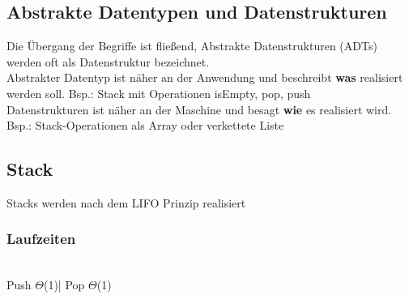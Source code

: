 \documentclass[jou,apacite]{apa6}
\begin{document}
\subsection{Abstrakte Datentypen und Datenstrukturen}
Die Übergang der Begriffe ist fließend, Abstrakte Datenstrukturen (ADTs) werden oft als Datenstruktur bezeichnet.
\\
Abstrakter Datentyp ist näher an der Anwendung und beschreibt {\bfseries was} realisiert werden soll.
\newline 
Bsp.: Stack mit Operationen isEmpty, pop, push
\\
Datenstrukturen ist näher an der Maschine und besagt {\bfseries wie} es realisiert wird.
\\
Bsp.: Stack-Operationen als Array oder verkettete Liste
\subsection{Stack}
Stacks werden nach dem LIFO Prinzip realisiert
\\
\subsubsection{Laufzeiten}
\\
Push    $\Theta$(1)| Pop     $\Theta$(1)
\end{document}
